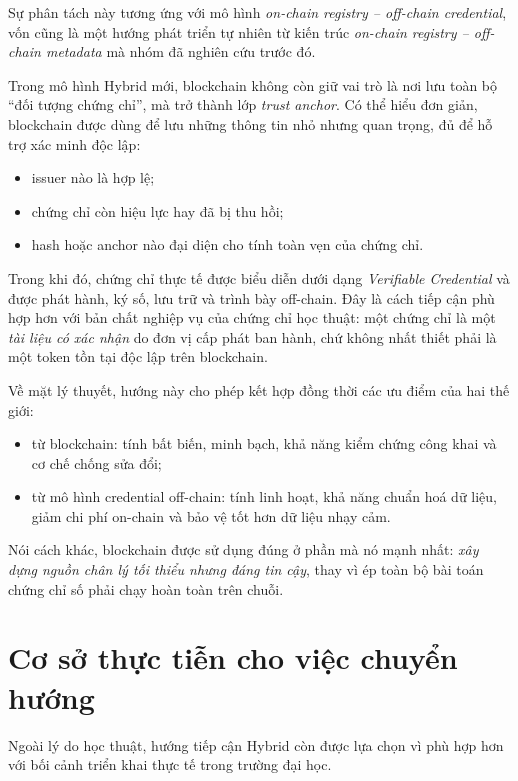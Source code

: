 Sự phân tách này tương ứng với mô hình \textit{on-chain registry -- off-chain credential}, vốn cũng là một hướng phát triển tự nhiên từ kiến trúc \textit{on-chain registry -- off-chain metadata} mà nhóm đã nghiên cứu trước đó. \cite{ipfs_whitepaper}

Trong mô hình Hybrid mới, blockchain không còn giữ vai trò là nơi lưu toàn bộ ``đối tượng chứng chỉ'', mà trở thành lớp \textit{trust anchor}. Có thể hiểu đơn giản, blockchain được dùng để lưu những thông tin nhỏ nhưng quan trọng, đủ để hỗ trợ xác minh độc lập:
\begin{itemize}
    \item issuer nào là hợp lệ;
    \item chứng chỉ còn hiệu lực hay đã bị thu hồi;
    \item hash hoặc anchor nào đại diện cho tính toàn vẹn của chứng chỉ.
\end{itemize}

Trong khi đó, chứng chỉ thực tế được biểu diễn dưới dạng \textit{Verifiable Credential} và được phát hành, ký số, lưu trữ và trình bày off-chain. Đây là cách tiếp cận phù hợp hơn với bản chất nghiệp vụ của chứng chỉ học thuật: một chứng chỉ là một \textit{tài liệu có xác nhận} do đơn vị cấp phát ban hành, chứ không nhất thiết phải là một token tồn tại độc lập trên blockchain.

Về mặt lý thuyết, hướng này cho phép kết hợp đồng thời các ưu điểm của hai thế giới:
\begin{itemize}
    \item từ blockchain: tính bất biến, minh bạch, khả năng kiểm chứng công khai và cơ chế chống sửa đổi;
    \item từ mô hình credential off-chain: tính linh hoạt, khả năng chuẩn hoá dữ liệu, giảm chi phí on-chain và bảo vệ tốt hơn dữ liệu nhạy cảm.
\end{itemize}

Nói cách khác, blockchain được sử dụng đúng ở phần mà nó mạnh nhất: \textit{xây dựng nguồn chân lý tối thiểu nhưng đáng tin cậy}, thay vì ép toàn bộ bài toán chứng chỉ số phải chạy hoàn toàn trên chuỗi.

\section{Cơ sở thực tiễn cho việc chuyển hướng}

Ngoài lý do học thuật, hướng tiếp cận Hybrid còn được lựa chọn vì phù hợp hơn với bối cảnh triển khai thực tế trong trường đại học.


